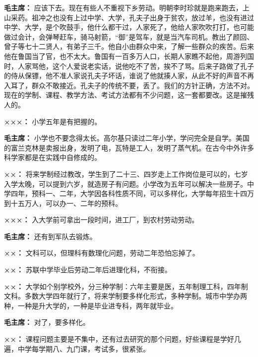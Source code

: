 \begin{duihua}
\item[\textbf{毛主席：}] 应该下去。现在有些人不重视下乡劳动。明朝李时珍就是跑来跑去，上山采药。祖冲之也没有上过中学、大学，孔夫子出身于贫农，放过羊，也没有进过中学、大学，是个吹鼓手，他什么都干过，人家死了，他给人家吹吹打打，也可能做过会计，会弹琴赶车，骑马射箭，“御”是驾车，就是当汽车司机。教出了颜回、曾子等七十二贤人，有弟子三千。他自小由群众中来，了解一些群众的疾苦。后来他在鲁国当了官，也不太大。鲁国有一百多万人口，长期人家瞧不起他，周游列国时，人家骂他，这个人爱说老实话，说他吃不了苦，挨不了骂。后来子路做了孔子的侍从保镖，他不准人家说孔夫子坏话，谁说了他就揍人家，从此不好的声音不再入耳了，群众不敢接近。孔夫子的传统不要，丢了。我们的方针正确，方法不对。现在的学制、课程、教学方法、考试方法都有不少问题，这一套都要改。这是摧残人的。

\item[\textbf{×××：}] 小学五年是有把握的。

\item[\textbf{毛主席：}] 小学也不要念得太长。高尔基只读过二年小学，学问完全是自学。美国的富兰克林是卖报出身，发明了电，瓦特是工人，发明了蒸气机。在古今中外许多科学家都是在实践中自修成的。

\item[\textbf{××：}] 将来学制经过教改，学生到了二十三、四岁走上工作岗位是可以的，七岁入学太晚，可以提到六岁，就造房子有问题。小学改为五年可以解决一些房子。中学四年，预科一、二年，大学因各科性质不同，可以多样化，大学每年招生十四万到十五万人，可以办一、二年的预科。

\item[\textbf{×××：}] 入大学前可拿出一段时间，进工厂，到农村劳动劳动。

\item[\textbf{毛主席：}] 还有到军队去锻炼。

\item[\textbf{××：}] 文科可以，但理科有数理化问题，劳动二年恐怕忘掉了。

\item[\textbf{××：}] 苏联中学毕业后劳动二年后进理化科，不衔接。

\item[\textbf{××：}] 大学如个别学校外，分三种学制：六年主要是医，五年制理工科，四年制文科。多数大学四年就行了，将来学制要多样化形式，多种学制。城市中学办两种，一种是升大学的，一种是毕业进专科，两年就毕业。

\item[\textbf{毛主席：}] 对了，要多样化。

\item[\textbf{××：}] 课程问题主要是不集中，还有过去研究的那个问题，好些课程是学好几遍，中学每学期八、九门课，考试多，很紧张。


\end{duihua}

